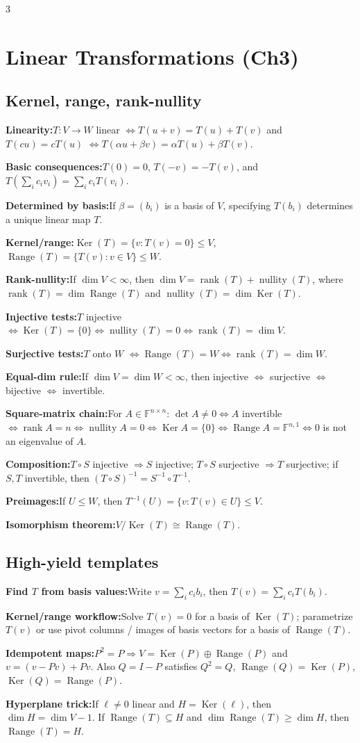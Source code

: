 \documentclass[10pt]{article}
\newcommand{\F}{\mathbb{F}}
\newcommand{\Ker}{\operatorname{Ker}}
\newcommand{\Range}{\operatorname{Range}}
\newcommand{\rank}{\operatorname{rank}}
\newcommand{\nullity}{\operatorname{nullity}}
\newenvironment{cheatitems}{\par\vspace{-1pt}}{\par\vspace{-1pt}}
\newcommand{\cheatrow}[2]{%
  \par\noindent\textbf{#1:}\nobreak\enspace #2\par
}
\begin{document}
\begin{multicols}{3}
\section*{Linear Transformations (Ch3)}

\subsection*{Kernel, range, rank-nullity}
\begin{cheatitems}
\cheatrow{Linearity}{$T:V\to W$ linear $\iff T(u+v)=T(u)+T(v)$ and $T(cu)=cT(u)$ $\iff T(\alpha u+\beta v)=\alpha T(u)+\beta T(v)$.}
\cheatrow{Basic consequences}{$T(0)=0$, $T(-v)=-T(v)$, and $T(\sum_i c_iv_i)=\sum_i c_iT(v_i)$.}
\cheatrow{Determined by basis}{If $\beta=(b_i)$ is a basis of $V$, specifying $T(b_i)$ determines a unique linear map $T$.}
\cheatrow{Kernel/range}{$\Ker(T)=\{v:T(v)=0\}\le V$, $\Range(T)=\{T(v):v\in V\}\le W$.}
\cheatrow{Rank-nullity}{If $\dim V<\infty$, then $\dim V=\rank(T)+\nullity(T)$, where $\rank(T)=\dim\Range(T)$ and $\nullity(T)=\dim\Ker(T)$.}
\cheatrow{Injective tests}{$T$ injective $\iff \Ker(T)=\{0\} \iff \nullity(T)=0 \iff \rank(T)=\dim V$.}
\cheatrow{Surjective tests}{$T$ onto $W$ $\iff \Range(T)=W \iff \rank(T)=\dim W$.}
\cheatrow{Equal-dim rule}{If $\dim V=\dim W<\infty$, then injective $\iff$ surjective $\iff$ bijective $\iff$ invertible.}
\cheatrow{Square-matrix chain}{For $A\in\F^{n\times n}$: $\det A\neq 0 \iff A$ invertible $\iff \rank A=n \iff \nullity A=0 \iff \Ker A=\{0\} \iff \Range A=\F^{n,1} \iff 0$ is not an eigenvalue of $A$.}
\cheatrow{Composition}{$T\circ S$ injective $\Rightarrow S$ injective; $T\circ S$ surjective $\Rightarrow T$ surjective; if $S,T$ invertible, then $(T\circ S)^{-1}=S^{-1}\circ T^{-1}$.}
\cheatrow{Preimages}{If $U\le W$, then $T^{-1}(U)=\{v:T(v)\in U\}\le V$.}
\cheatrow{Isomorphism theorem}{$V/\Ker(T)\cong \Range(T)$.}
\end{cheatitems}

\subsection*{High-yield templates}
\begin{cheatitems}
\cheatrow{Find $T$ from basis values}{Write $v=\sum_i c_i b_i$, then $T(v)=\sum_i c_iT(b_i)$.}
\cheatrow{Kernel/range workflow}{Solve $T(v)=0$ for a basis of $\Ker(T)$; parametrize $T(v)$ or use pivot columns / images of basis vectors for a basis of $\Range(T)$.}
\cheatrow{Idempotent maps}{$P^2=P \Rightarrow V=\Ker(P)\oplus\Range(P)$ and $v=(v-Pv)+Pv$. Also $Q=I-P$ satisfies $Q^2=Q$, $\Range(Q)=\Ker(P)$, $\Ker(Q)=\Range(P)$.}
\cheatrow{Hyperplane trick}{If $\ell\neq 0$ linear and $H=\Ker(\ell)$, then $\dim H=\dim V-1$. If $\Range(T)\subseteq H$ and $\dim\Range(T)\ge \dim H$, then $\Range(T)=H$.}
\end{cheatitems}


\end{multicols}
\end{document}
